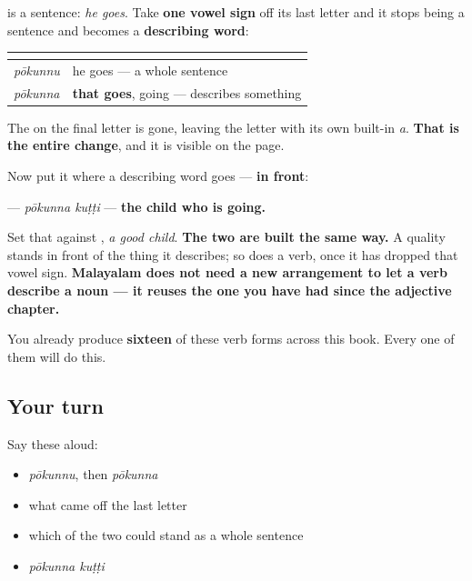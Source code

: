 \begin{grammarlens}[title={Grammar Lens: take the vowel sign off the end}]
\textbf{} is a sentence: \emph{he goes}. Take \textbf{one vowel sign} off its last letter and it stops being a sentence and becomes a \textbf{describing word}:

\noindent
\begin{tabularx}{\linewidth}{@{}>{\raggedright\arraybackslash}X>{\raggedright\arraybackslash}X@{}}
\toprule
\textbf{} & \textbf{} \\
\midrule
\textbf{\ml{പോകുന്നു}} \emph{pōkunnu} & he goes — a whole sentence \\
\textbf{\ml{പോകുന്ന}} \emph{pōkunna} & \textbf{that goes}, going — describes something \\
\bottomrule
\end{tabularx}

The \textbf{} on the final letter is gone, leaving the letter with its own built-in \emph{a}. \textbf{That is the entire change}, and it is visible on the page.

Now put it where a describing word goes — \textbf{in front}:

\textbf{ } — \emph{pōkunna kuṭṭi} — \textbf{the child who is going.}

Set that against \textbf{ }, \emph{a good child}. \textbf{The two are built the same way.} A quality stands in front of the thing it describes; so does a verb, once it has dropped that vowel sign. \textbf{Malayalam does not need a new arrangement to let a verb describe a noun — it reuses the one you have had since the adjective chapter.}

You already produce \textbf{sixteen} of these verb forms across this book. Every one of them will do this.
\end{grammarlens}

\subsection*{Your turn}
Say these aloud:

\begin{itemize}
\raggedright
  \item \emph{pōkunnu}, then \emph{pōkunna}
  \item what came off the last letter
  \item which of the two could stand as a whole sentence
  \item \emph{pōkunna kuṭṭi}
\end{itemize}

